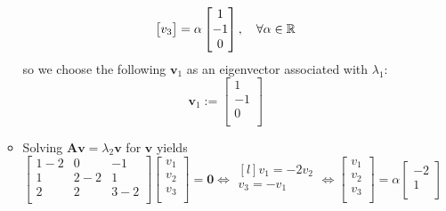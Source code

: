 \documentclass[12pt,a4paper]{article}
\begin{document}
\begin{itemize}
\begin{itemize}
\begin{equation}
\begin{bmatrix}
        v_{3} \\
      \end{bmatrix}
      =
      \alpha
      \begin{bmatrix}
        1 \\
        -1 \\
        0 \\
      \end{bmatrix},
      \quad \forall \alpha \in \mathbb{R}
    \end{equation}
    so we choose the following $\bm{v}_{1}$ as an eigenvector associated with $\lambda_{1}$:
    \begin{equation}\nonumber%
      \bm{v}_{1} := 
      \begin{bmatrix}
        1 \\
        -1 \\
        0 \\
      \end{bmatrix}
    \end{equation}
  \item Solving $\bm{A}\bm{v}=\lambda_{2}\bm{v}$ for $\bm{v}$ yields
    \begin{equation}\nonumber%
      \begin{bmatrix}
        1-2 & 0 & -1 \\
        1 & 2-2 & 1 \\
        2 & 2 & 3-2 \\
      \end{bmatrix}
      \begin{bmatrix}
        v_{1} \\
        v_{2} \\
        v_{3} \\
      \end{bmatrix}
      = \bm{0}
      \iff
      \begin{matrix*}[l]
        v_{1} = -2v_{2} \\
        v_{3} = -v_{1} \\
      \end{matrix*}
      \iff
      \begin{bmatrix}
        v_{1} \\
        v_{2} \\
        v_{3} \\
      \end{bmatrix}
      =
      \alpha
      \begin{bmatrix}
        -2 \\
        1 \\

\end{bmatrix}
\end{equation}
\end{itemize}
\end{itemize}
\end{document}
